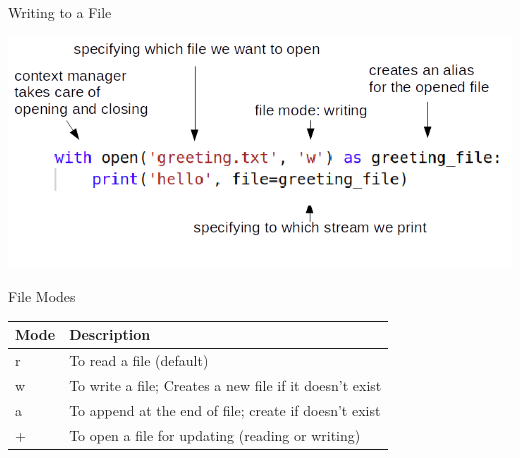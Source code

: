 \documentclass[
  american,
  ignorenonframetext,
]{beamer}
\begin{document}
\begin{frame}{Writing to a File}
\protect\hypertarget{writing-to-a-file}{}

\includegraphics[width=1\textwidth,height=\textheight]{06_FileIO/with_open_annotated.png}

\end{frame}

\begin{frame}{File Modes}
\protect\hypertarget{file-modes}{}

\begin{longtable}[]{@{}ll@{}}
\toprule
Mode & Description\tabularnewline
\midrule
\endhead
r & To read a file (default)\tabularnewline
w & To write a file; Creates a new file if it doesn't
exist\tabularnewline
a & To append at the end of file; create if doesn't exist\tabularnewline
+ & To open a file for updating (reading or writing)\tabularnewline
\bottomrule
\end{longtable}


\end{frame}
\end{document}
